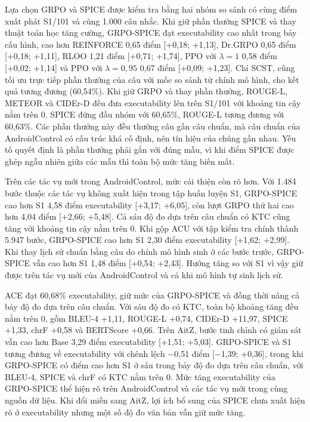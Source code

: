 Lựa chọn GRPO và SPICE được kiểm tra bằng hai nhóm so sánh có cùng điểm xuất phát S1/101 và cùng 1.000 câu nhắc. Khi giữ phần thưởng SPICE và thay thuật toán học tăng cường, GRPO-SPICE đạt executability cao nhất trong bảy cấu hình, cao hơn REINFORCE 0,65 điểm [+0,18; +1,13], Dr.GRPO 0,65 điểm [+0,18; +1,11], RLOO 1,21 điểm [+0,71; +1,74], PPO với $\lambda = 1$ 0,58 điểm [+0,02; +1,14] và PPO với $\lambda = 0{,}95$ 0,67 điểm [+0,09; +1,23]. Chỉ SCST, cũng tối ưu trực tiếp phần thưởng của câu với mốc so sánh từ chính mô hình, cho kết quả tương đương (60,54\%). Khi giữ GRPO và thay phần thưởng, ROUGE-L, METEOR và CIDEr-D đều đưa executability lên trên S1/101 với khoảng tin cậy nằm trên 0. SPICE đứng đầu nhóm với 60,65\%, ROUGE-L tương đương với 60,63\%. Các phần thưởng này đều thưởng câu gần câu chuẩn, mà câu chuẩn của AndroidControl có cấu trúc khá cố định, nên tín hiệu của chúng gần nhau. Yếu tố quyết định là phần thưởng phải gắn với đúng mẫu, vì khi điểm SPICE được ghép ngẫu nhiên giữa các mẫu thì toàn bộ mức tăng biến mất.

Trên các tác vụ mới trong AndroidControl, mức cải thiện còn rõ hơn. Với 1.484 bước thuộc các tác vụ không xuất hiện trong tập huấn luyện S1, GRPO-SPICE cao hơn S1 4,58 điểm executability [+3,17; +6,05], còn lượt GRPO thứ hai cao hơn 4,04 điểm [+2,66; +5,48]. Cả sáu độ đo dựa trên câu chuẩn có KTC cũng tăng với khoảng tin cậy nằm trên 0. Khi gộp ACU với tập kiểm tra chính thành 5.947 bước, GRPO-SPICE cao hơn S1 2,30 điểm executability [+1,62; +2,99]. Khi thay lịch sử chuẩn bằng câu do chính mô hình sinh ở các bước trước, GRPO-SPICE vẫn cao hơn S1 1,48 điểm [+0,54; +2,43]. Hướng tăng so với S1 vì vậy giữ được trên tác vụ mới của AndroidControl và cả khi mô hình tự sinh lịch sử.

ACE đạt 60,68\% executability, giữ mức của GRPO-SPICE và đồng thời nâng cả bảy độ đo dựa trên câu chuẩn. Với sáu độ đo có KTC, toàn bộ khoảng tăng đều nằm trên 0, gồm BLEU-4 +1,11, ROUGE-L +0,74, CIDEr-D +11,97, SPICE +1,33, chrF +0,58 và BERTScore +0,66. Trên AitZ, bước tinh chỉnh có giám sát vẫn cao hơn Base 3,29 điểm executability [+1,51; +5,03]. GRPO-SPICE và S1 tương đương về executability với chênh lệch $-$0,51 điểm [$-$1,39; +0,36], trong khi GRPO-SPICE có điểm cao hơn S1 ở sáu trong bảy độ đo dựa trên câu chuẩn, với BLEU-4, SPICE và chrF có KTC nằm trên 0. Mức tăng executability của GRPO-SPICE thể hiện rõ trên AndroidControl và các tác vụ mới trong cùng nguồn dữ liệu. Khi đổi miền sang AitZ, lợi ích bổ sung của SPICE chưa xuất hiện rõ ở executability nhưng một số độ đo văn bản vẫn giữ mức tăng.


